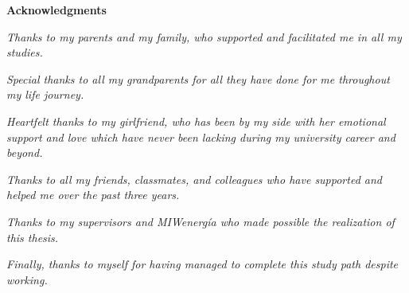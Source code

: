 \thispagestyle{empty}

\begin{center}
  {\bf \Huge Acknowledgments}
\end{center}

\vspace{4cm}

\noindent
\emph{Thanks to my parents and my family, who supported and facilitated me in all my studies.}

\noindent
\emph{Special thanks to all my grandparents for all they have done for me throughout my life journey.}

\vspace{\baselineskip}

\noindent
\emph{Heartfelt thanks to my girlfriend, who has been by my side with her emotional support and love which have never been lacking during my university career and beyond.}

\vspace{\baselineskip}

\noindent
\emph{Thanks to all my friends, classmates, and colleagues who have supported and helped me over the past three years.}

\vspace{\baselineskip}

\noindent
\emph{Thanks to my supervisors and MIWenergía who made possible the realization of this thesis.}

\vspace{\baselineskip}

\noindent
\emph{Finally, thanks to myself for having managed to complete this study path despite working.}
